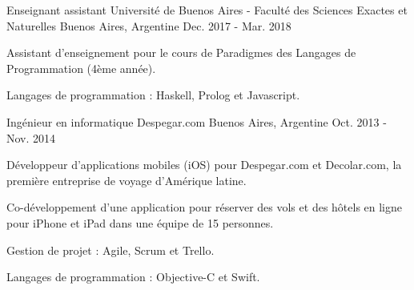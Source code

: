 \begin{cventries}
\cventry
{Enseignant assistant} %
{Université de Buenos Aires - Faculté des Sciences Exactes et Naturelles} %
{Buenos Aires, Argentine} %
{Dec. 2017 - Mar. 2018} %
{
  \begin{cvitems} %
    \item Assistant d'enseignement pour le cours de Paradigmes des Langages de Programmation (4ème année). 
    \item Langages de programmation : Haskell, Prolog et Javascript.
  \end{cvitems}
}


\cventry
{Ingénieur en informatique}
{Despegar.com}
{Buenos Aires, Argentine}
{Oct. 2013 - Nov. 2014}
{
\begin{cvitems}
\item Développeur d'applications mobiles (iOS) pour Despegar.com et Decolar.com, la première entreprise de voyage d'Amérique latine.
\item Co-développement d'une application pour réserver des vols et des hôtels en ligne pour iPhone et iPad dans une équipe de 15 personnes. 
\item Gestion de projet : Agile, Scrum et Trello.
\item Langages de programmation : Objective-C et Swift.
\end{cvitems}
} 
\end{cventries}
